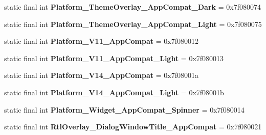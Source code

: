 \begin{DoxyCompactItemize}
\item 
\hypertarget{classandroid_1_1support_1_1design_1_1_r_1_1style_addbc8b61ae0af4b936ddbeb11b8eb1a9}{}static final int {\bfseries Platform\+\_\+\+Theme\+Overlay\+\_\+\+App\+Compat\+\_\+\+Dark} = 0x7f080074\label{classandroid_1_1support_1_1design_1_1_r_1_1style_addbc8b61ae0af4b936ddbeb11b8eb1a9}

\item 
\hypertarget{classandroid_1_1support_1_1design_1_1_r_1_1style_a2a388b085535b1ef7e8936d787749259}{}static final int {\bfseries Platform\+\_\+\+Theme\+Overlay\+\_\+\+App\+Compat\+\_\+\+Light} = 0x7f080075\label{classandroid_1_1support_1_1design_1_1_r_1_1style_a2a388b085535b1ef7e8936d787749259}

\item 
\hypertarget{classandroid_1_1support_1_1design_1_1_r_1_1style_a120476555f0826a53df3beb963a46a01}{}static final int {\bfseries Platform\+\_\+\+V11\+\_\+\+App\+Compat} = 0x7f080012\label{classandroid_1_1support_1_1design_1_1_r_1_1style_a120476555f0826a53df3beb963a46a01}

\item 
\hypertarget{classandroid_1_1support_1_1design_1_1_r_1_1style_a9e3ffa0fb76a607fdfff5eee8278854d}{}static final int {\bfseries Platform\+\_\+\+V11\+\_\+\+App\+Compat\+\_\+\+Light} = 0x7f080013\label{classandroid_1_1support_1_1design_1_1_r_1_1style_a9e3ffa0fb76a607fdfff5eee8278854d}

\item 
\hypertarget{classandroid_1_1support_1_1design_1_1_r_1_1style_a77d8769a1cbbb334311adcadf62a19e4}{}static final int {\bfseries Platform\+\_\+\+V14\+\_\+\+App\+Compat} = 0x7f08001a\label{classandroid_1_1support_1_1design_1_1_r_1_1style_a77d8769a1cbbb334311adcadf62a19e4}

\item 
\hypertarget{classandroid_1_1support_1_1design_1_1_r_1_1style_a01708d63b302bcd3f6f55609289ab28e}{}static final int {\bfseries Platform\+\_\+\+V14\+\_\+\+App\+Compat\+\_\+\+Light} = 0x7f08001b\label{classandroid_1_1support_1_1design_1_1_r_1_1style_a01708d63b302bcd3f6f55609289ab28e}

\item 
\hypertarget{classandroid_1_1support_1_1design_1_1_r_1_1style_a4023bb1017cc57b6f31dd09e187377e9}{}static final int {\bfseries Platform\+\_\+\+Widget\+\_\+\+App\+Compat\+\_\+\+Spinner} = 0x7f080014\label{classandroid_1_1support_1_1design_1_1_r_1_1style_a4023bb1017cc57b6f31dd09e187377e9}

\item 
\hypertarget{classandroid_1_1support_1_1design_1_1_r_1_1style_abb7a1569de346ab246bb77f817bd1ce9}{}static final int {\bfseries Rtl\+Overlay\+\_\+\+Dialog\+Window\+Title\+\_\+\+App\+Compat} = 0x7f080021\label{classandroid_1_1support_1_1design_1_1_r_1_1style_abb7a1569de346ab246bb77f817bd1ce9}


\end{DoxyCompactItemize}
